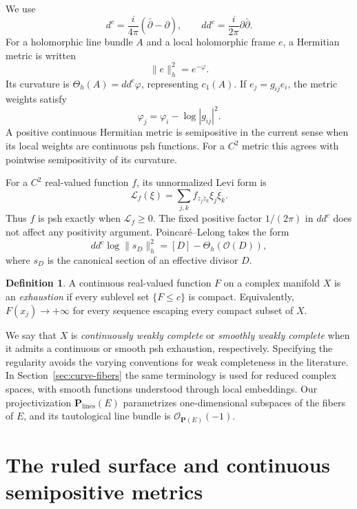 \documentclass[11pt]{amsart}
\theoremstyle{definition}
\newtheorem{definition}[theorem]{Definition}
\theoremstyle{remark}
\numberwithin{equation}{section}
\newcommand{\PP}{\mathbf P}
\newcommand{\OO}{\mathcal O}
\newcommand{\ddc}{dd^c}
\newcommand{\Levi}{\mathcal L}
\newcommand{\barp}{\bar\partial}
\begin{document}
We use
\[
 d^c=\frac{i}{4\pi}(\barp-\partial),\qquad
 \ddc=\frac{i}{2\pi}\partial\barp.
\]
For a holomorphic line bundle $A$ and a local holomorphic frame $e$, a
Hermitian metric is written
\[
 \|e\|_h^2=e^{-\varphi}.
\]
Its curvature is $\Theta_h(A)=\ddc\varphi$, representing $c_1(A)$.
If $e_j=g_{ij}e_i$, the metric weights satisfy
\begin{equation}\label{eq:metric-transition}
 \varphi_j=\varphi_i-\log|g_{ij}|^2.
\end{equation}
A positive continuous Hermitian metric is semipositive in the current
sense when its local weights are continuous psh functions. For a $C^2$
metric this agrees with pointwise semipositivity of its curvature.

For a $C^2$ real-valued function $f$, its unnormalized Levi form is
\[
 \Levi_f(\xi)=\sum_{j,k}f_{z_j\bar z_k}\xi_j\overline{\xi_k}.
\]
Thus $f$ is psh exactly when $\Levi_f\ge0$. The fixed positive factor
$1/(2\pi)$ in $\ddc$ does not affect any positivity argument.
Poincar\'e--Lelong takes the form
\begin{equation}\label{eq:PL}
 \ddc\log\|s_D\|_h^2=[D]-\Theta_h(\OO(D)),
\end{equation}
where $s_D$ is the canonical section of an effective divisor $D$.

\begin{definition}
A continuous real-valued function $F$ on a complex manifold $X$ is an
\emph{exhaustion} if every sublevel set $\{F\le c\}$ is compact.
Equivalently, $F(x_j)\to+\infty$ for every sequence escaping every
compact subset of $X$.
\end{definition}

We say that $X$ is \emph{continuously weakly complete} or
\emph{smoothly weakly complete} when it admits a continuous or smooth
psh exhaustion, respectively. Specifying the regularity avoids the
varying conventions for weak completeness in the literature.
In Section~\ref{sec:curve-fibers} the same terminology is used for
reduced complex spaces, with smooth functions understood through
local embeddings.
Our projectivization $\PP_{\mathrm{lines}}(E)$ parametrizes
one-dimensional subspaces of the fibers of $E$, and its tautological
line bundle is $\OO_{\PP(E)}(-1)$.

\section{The ruled surface and continuous semipositive metrics}\label{sec:metrics}
\end{document}

